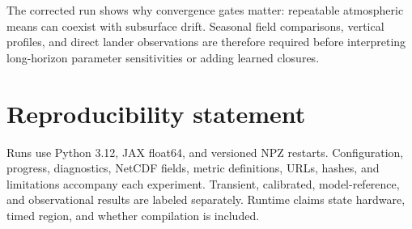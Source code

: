 \documentclass{article}
\begin{document}
The corrected run shows why convergence gates matter: repeatable atmospheric
means can coexist with subsurface drift. Seasonal field comparisons, vertical
profiles, and direct lander observations are therefore required before
interpreting long-horizon parameter sensitivities or adding learned closures.

\section*{Reproducibility statement}
Runs use Python 3.12, JAX float64, and versioned NPZ restarts. Configuration,
progress, diagnostics, NetCDF fields, metric definitions, URLs, hashes, and
limitations accompany each experiment. Transient, calibrated, model-reference,
and observational results are labeled separately. Runtime claims state hardware, timed region, and
whether compilation is included.

\begingroup\small

\endgroup
\end{document}
